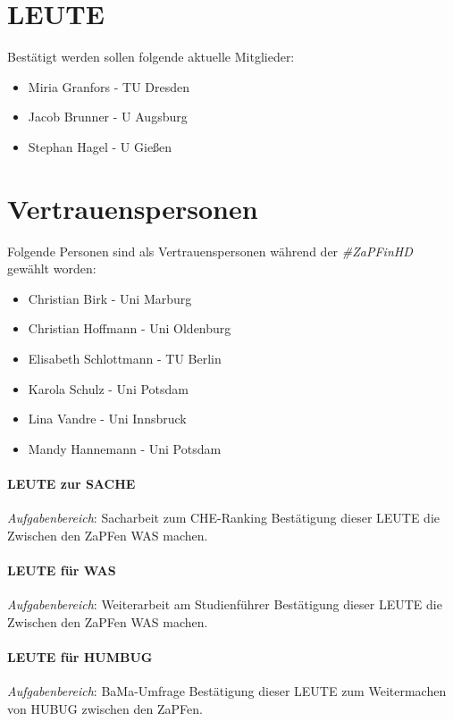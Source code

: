   \section{LEUTE}
    Bestätigt werden sollen folgende aktuelle Mitglieder:
    \begin{itemize}
      \item Miria Granfors - TU Dresden
      \item Jacob Brunner - U Augsburg
      \item Stephan Hagel - U Gießen
    \end{itemize}

  \section{Vertrauenspersonen}
    Folgende Personen sind als Vertrauenspersonen während der \textit{\#ZaPFinHD} gewählt worden:
      \begin{itemize}
        \item Christian Birk - Uni Marburg
        \item Christian Hoffmann - Uni Oldenburg
        \item Elisabeth Schlottmann - TU Berlin
        \item Karola Schulz - Uni Potsdam
        \item Lina Vandre - Uni Innsbruck
        \item Mandy Hannemann - Uni Potsdam
      \end{itemize}

    \paragraph{LEUTE zur SACHE}
      \textit{Aufgabenbereich}: Sacharbeit zum CHE-Ranking
      Bestätigung dieser LEUTE die Zwischen den ZaPFen WAS machen.

    \paragraph{LEUTE für WAS}
      \textit{Aufgabenbereich}: Weiterarbeit am Studienführer
      Bestätigung dieser LEUTE die Zwischen den ZaPFen WAS machen.

    \paragraph{LEUTE für HUMBUG}
      \textit{Aufgabenbereich}: BaMa-Umfrage
      Bestätigung dieser LEUTE zum Weitermachen von HUBUG zwischen den ZaPFen.
